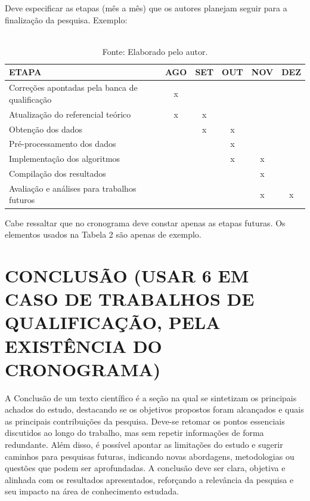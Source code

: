 \documentclass[
	article,
	12pt,
	oneside,
	a4paper,
	english,
	brazil,
	sumario=tradicional
]{abntex2}
\begin{document}
Deve especificar as etapas (mês a mês) que os autores planejam seguir para a finalização da pesquisa. Exemplo:

\begin{table}[ht]
	\centering
	\caption{Cronograma proposto para continuidade da pesquisa.}
	\begin{tabular}{l c c c c c}
		\toprule
		ETAPA & AGO & SET & OUT & NOV & DEZ \\ 
		\midrule
		Correções apontadas pela banca de qualificação & x &   &   &   &   \\ 
		Atualização do referencial teórico             & x & x &   &   &   \\ 
		Obtenção dos dados                             &   & x & x &   &   \\ 
		Pré-processamento dos dados                    &   &   & x &   &   \\ 
		Implementação dos algoritmos                   &   &   & x & x &   \\ 
		Compilação dos resultados                      &   &   &   & x &   \\ 
		Avaliação e análises para trabalhos futuros    &   &   &   & x & x \\ 
		\bottomrule
	\end{tabular}
	\caption*{\\Fonte: Elaborado pelo autor.}
	\label{tab:cronograma}
\end{table}

Cabe ressaltar que no cronograma deve constar apenas as etapas futuras. Os elementos usados na Tabela 2 são apenas de exemplo.

% 

\section{\textbf{CONCLUSÃO (USAR 6 EM CASO DE TRABALHOS DE QUALIFICAÇÃO, PELA EXISTÊNCIA DO CRONOGRAMA)}}

A Conclusão de um texto científico é a seção na qual se sintetizam os principais achados do estudo, destacando se os objetivos propostos foram alcançados e quais as principais contribuições da pesquisa. Deve-se retomar os pontos essenciais discutidos ao longo do trabalho, mas sem repetir informações de forma redundante. Além disso, é possível apontar as limitações do estudo e sugerir caminhos para pesquisas futuras, indicando novas abordagens, metodologias ou questões que podem ser aprofundadas. A conclusão deve ser clara, objetiva e alinhada com os resultados apresentados, reforçando a relevância da pesquisa e seu impacto na área de conhecimento estudada.
\end{document}
